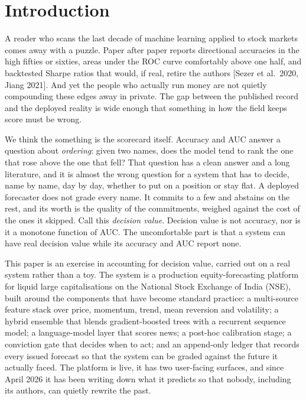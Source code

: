 \documentclass[10pt,a4paper,oneside]{article}
\theoremstyle{definition}
\theoremstyle{plain}
\begin{document}
\section{Introduction}
\label{sec:intro}
A reader who scans the last decade of machine learning applied to stock markets
comes away with a puzzle. Paper after paper reports directional accuracies in the
high fifties or sixties, areas under the ROC curve comfortably above one half, and
backtested Sharpe ratios that would, if real, retire the authors
[Sezer et al.\ 2020, Jiang 2021]. And yet the people who actually run money are not
quietly compounding these edges away in private. The gap between the published
record and the deployed reality is wide enough that something in how the field
keeps score must be wrong.

We think the something is the scorecard itself. Accuracy and AUC answer a question
about \emph{ordering}: given two names, does the model tend to rank the one that
rose above the one that fell? That question has a clean answer and a long
literature, and it is almost the wrong question for a system that has to decide,
name by name, day by day, whether to put on a position or stay flat. A deployed
forecaster does not grade every name. It commits to a few and abstains on the rest,
and its worth is the quality of the commitments, weighed against the cost of the
ones it skipped. Call this \emph{decision value}. Decision value is not accuracy,
nor is it a monotone function of AUC. The uncomfortable part is that a system can
have real decision value while its accuracy and AUC report none.

This paper is an exercise in accounting for decision value, carried out on a real
system rather than a toy. The system is a production equity-forecasting platform
for liquid large capitalisations on the National Stock Exchange of India (NSE),
built around the components that have become standard practice: a multi-source
feature stack over price, momentum, trend, mean reversion and volatility; a hybrid
ensemble that blends gradient-boosted trees with a recurrent sequence model; a
language-model layer that scores news; a post-hoc calibration stage; a conviction
gate that decides when to act; and an append-only ledger that records every issued
forecast so that the system can be graded against the future it actually faced.
The platform is live, it has two user-facing surfaces, and since April 2026 it has
been writing down what it predicts so that nobody, including its authors, can quietly
rewrite the past.
\end{document}
